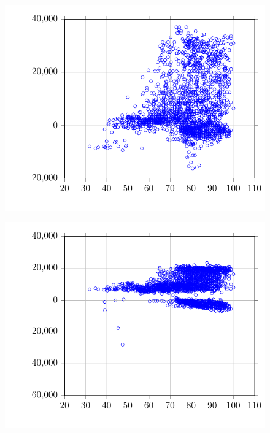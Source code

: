 \begin{figure}
\centering
\includegraphics{Plots/29/2017-06-27-1358-BtuhrvsOADryBulbTemperatureNOAAF.pdf}
\caption{}
\label{fig:2017-06-27-1358-BtuhrvsOADryBulbTemperatureNOAAF}
\end{figure}

\begin{figure}
\centering
\includegraphics{Plots/30/2017-06-27-1359-BtuhrvsOADryBulbTemperatureNOAAF.pdf}
\caption{}
\label{fig:2017-06-27-1359-BtuhrvsOADryBulbTemperatureNOAAF}
\end{figure}

